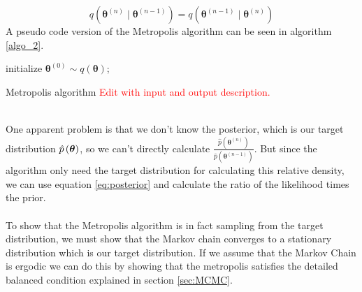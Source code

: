 \begin{equation*}
    q(\boldsymbol{\theta}^{(n)}\mid \boldsymbol{\theta}^{(n-1)})=q(\boldsymbol{\theta}^{(n-1)}\mid \boldsymbol{\theta}^{(n)})
\end{equation*}
A pseudo code version of the Metropolis algorithm can be seen in algorithm \ref{algo_2}.
\begin{algorithm}\label{algo_2}

\SetAlgoLined
initialize $\boldsymbol{\theta}^{(0)}\sim q(\boldsymbol{\theta})$;

\caption{Metropolis algorithm \textcolor{red}{Edit with input and output description.}}
\end{algorithm}\\
One apparent problem is that we don't know the posterior, which is our target distribution $\hat{p}\left (\boldsymbol{\theta}\right)$, so we can't directly calculate $\frac{\hat{p}(\boldsymbol{\theta}^{(n)})}{\hat{p}\left(\boldsymbol{\theta}^{(n-1)}\right)}$. But since the algorithm only need the target distribution for calculating this relative density, we can use equation \ref{eq:posterior} and calculate the ratio of the likelihood times the prior. 
\\
\\
To show that the Metropolis algorithm is in fact sampling from the target distribution, we must show that the Markov chain converges to a stationary distribution which is our target distribution. If we assume that the Markov Chain is ergodic we can do this by showing that the metropolis satisfies the detailed balanced condition explained in section \ref{sec:MCMC}.\\
\\
